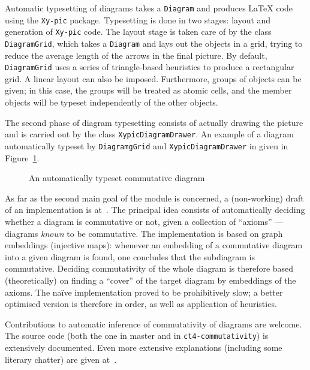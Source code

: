 Automatic typesetting of diagrams takes a \texttt{Diagram} and produces \LaTeX{}
code using the \texttt{Xy-pic} package.  Typesetting is done in two stages:
layout and generation of \texttt{Xy-pic} code.  The layout stage is taken care
of by the class \texttt{DiagramGrid}, which takes a \texttt{Diagram} and lays out
the objects in a grid, trying to reduce the average length of the arrows in the
final picture.  By default, \texttt{DiagramGrid} uses a series of triangle-based
heuristics to produce a rectangular grid.  A linear layout can also be imposed.
Furthermore, groups of objects can be given; in this case, the groups will be
treated as atomic cells, and the member objects will be typeset independently of
the other objects.

The second phase of diagram typesetting consists of actually drawing the picture
and is carried out by the class \texttt{XypicDiagramDrawer}.  An example of a
diagram automatically typeset by \texttt{DiagramgGrid} and
\texttt{XypicDiagramDrawer} in given in Figure~\ref{fig:cat:loops}.
\begin{figure}[h]
  \centerline{
  }
  \caption{An automatically typeset commutative diagram}
  \label{fig:cat:loops}
\end{figure}

As far as the second main goal of the module is concerned, a (non-working) draft
of an implementation is at~\cite{ct4commutativity}.  The principal idea consists
of automatically deciding whether a diagram is commutative or not, given a
collection of ``axioms'' --- diagrams \textit{known} to be commutative.  The
implementation is based on graph embeddings (injective maps): whenever an
embedding of a commutative diagram into a given diagram is found, one concludes
that the subdiagram is commutative.  Deciding commutativity of the whole diagram
is therefore based (theoretically) on finding a ``cover'' of the target diagram
by embeddings of the axioms.  The na\"{i}ve implementation proved to be
prohibitively slow; a better optimised version is therefore in order, as well as
application of heuristics.

Contributions to automatic inference of commutativity of diagrams are welcome.
The source code (both the one in master and in \texttt{ct4-commutativity}) is
extensively documented.  Even more extensive explanations (including some
literary chatter) are given at~\cite{scolobb}.

